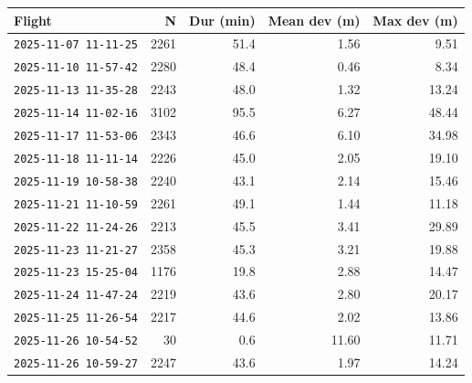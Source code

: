 \begin{tabular}{lrrrr}
\toprule
Flight & N & Dur (min) & Mean dev (m) & Max dev (m) \\
\midrule
\texttt{2025-11-07 11-11-25} & 2261 & 51.4 & 1.56 & 9.51 \\
\texttt{2025-11-10 11-57-42} & 2280 & 48.4 & 0.46 & 8.34 \\
\texttt{2025-11-13 11-35-28} & 2243 & 48.0 & 1.32 & 13.24 \\
\texttt{2025-11-14 11-02-16} & 3102 & 95.5 & 6.27 & 48.44 \\
\texttt{2025-11-17 11-53-06} & 2343 & 46.6 & 6.10 & 34.98 \\
\texttt{2025-11-18 11-11-14} & 2226 & 45.0 & 2.05 & 19.10 \\
\texttt{2025-11-19 10-58-38} & 2240 & 43.1 & 2.14 & 15.46 \\
\texttt{2025-11-21 11-10-59} & 2261 & 49.1 & 1.44 & 11.18 \\
\texttt{2025-11-22 11-24-26} & 2213 & 45.5 & 3.41 & 29.89 \\
\texttt{2025-11-23 11-21-27} & 2358 & 45.3 & 3.21 & 19.88 \\
\texttt{2025-11-23 15-25-04} & 1176 & 19.8 & 2.88 & 14.47 \\
\texttt{2025-11-24 11-47-24} & 2219 & 43.6 & 2.80 & 20.17 \\
\texttt{2025-11-25 11-26-54} & 2217 & 44.6 & 2.02 & 13.86 \\
\texttt{2025-11-26 10-54-52} & 30 & 0.6 & 11.60 & 11.71 \\
\texttt{2025-11-26 10-59-27} & 2247 & 43.6 & 1.97 & 14.24 \\
\bottomrule
\end{tabular}
